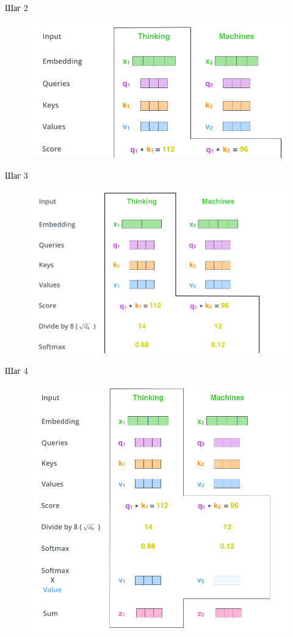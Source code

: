 \documentclass[notes,12pt, aspectratio=169]{beamer}
\begin{document}
\begin{frame}{Шаг 2}
\begin{figure}
	\centering
	\includegraphics[width=0.8\linewidth]{images/step_2}
	\label{fig:seq2seq}
\end{figure}
\end{frame}

\begin{frame}{Шаг 3}
\begin{figure}
	\centering
	\includegraphics[width=0.8\linewidth]{images/step_3}
	\label{fig:seq2seq}
\end{figure}
\end{frame}

\begin{frame}{Шаг 4}
\begin{figure}
	\centering
	\includegraphics[width=0.5\linewidth]{images/step_4}
	\label{fig:seq2seq}
\end{figure}
\end{frame}
\end{document}
